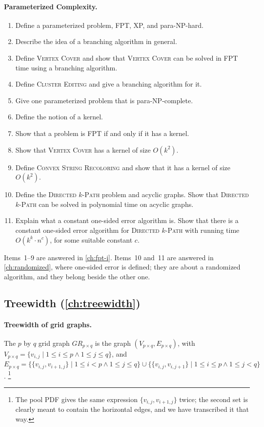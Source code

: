 \paragraph{Parameterized Complexity.}
\begin{enumerate}
  \item Define a parameterized problem, FPT, XP, and para-NP-hard.
  \item Describe the idea of a branching algorithm in general.
  \item Define \textsc{Vertex Cover} and show that \textsc{Vertex Cover} can be
        solved in FPT time using a branching algorithm.
  \item Define \textsc{Cluster Editing} and give a branching algorithm for it.
  \item Give one parameterized problem that is para-NP-complete.
  \item Define the notion of a kernel.
  \item Show that a problem is FPT if and only if it has a kernel.
  \item Show that \textsc{Vertex Cover} has a kernel of size $O(k^2)$.
  \item Define \textsc{Convex String Recoloring} and show that it has a kernel of
        size $O(k^2)$.
  \item Define the \textsc{Directed $k$-Path} problem and acyclic graphs. Show
        that \textsc{Directed $k$-Path} can be solved in polynomial time on
        acyclic graphs.
  \item Explain what a constant one-sided error algorithm is. Show that there is
        a constant one-sided error algorithm for \textsc{Directed $k$-Path} with
        running time $O(k^k \cdot n^c)$, for some suitable constant $c$.
\end{enumerate}

\begin{remark}
Items~1--9 are answered in \cref{ch:fpt-i}. Items~10 and~11 are answered in
\cref{ch:randomized}, where one-sided error is defined; they are about a
randomized algorithm, and they belong beside the other one.
\end{remark}

\subsection*{Treewidth (\cref{ch:treewidth})}

\paragraph{Treewidth of grid graphs.}
The $p$ by $q$ grid graph $GR_{p \times q}$ is the graph
$(V_{p \times q}, E_{p \times q})$, with
$V_{p \times q} = \{v_{i,j} \mid 1 \le i \le p \wedge 1 \le j \le q\}$, and
$E_{p \times q} = \{\{v_{i,j}, v_{i+1,j}\} \mid 1 \le i < p \wedge 1 \le j \le q\}
\cup \{\{v_{i,j}, v_{i,j+1}\} \mid 1 \le i \le p \wedge 1 \le j < q\}$.%
\footnote{The pool PDF gives the same expression $\{v_{i,j},v_{i+1,j}\}$ twice;
the second set is clearly meant to contain the horizontal edges, and we have
transcribed it that way.}

